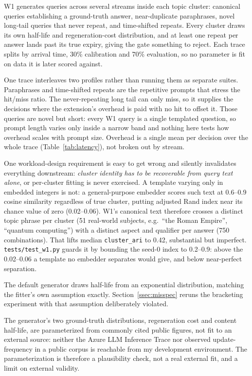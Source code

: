 \documentclass[10pt]{article}
\begin{document}
W1 generates queries across several streams inside each topic cluster: canonical queries
establishing a ground-truth answer, near-duplicate paraphrases, novel long-tail queries
that never repeat, and time-shifted repeats. Every cluster draws its own half-life and
regeneration-cost distribution, and at least one repeat per answer lands past its true
expiry, giving the gate something to reject. Each trace splits by arrival time, 30\%
calibration and 70\% evaluation, so no parameter is fit on data it is later scored
against.

One trace interleaves two profiles rather than running them as separate suites. Paraphrases
and time-shifted repeats are the repetitive prompts that stress the hit/miss ratio. The
never-repeating long tail can only miss, so it supplies the decisions where the extension's
overhead is paid with no hit to offset it. Those queries are novel but short: every W1 query is
a single templated question, so prompt length varies only inside a narrow band and nothing
here tests how overhead scales with prompt size. Overhead is a single mean per decision over
the whole trace (Table~\ref{tab:latency}), not broken out by stream.

One workload-design requirement is easy to get wrong and silently invalidates everything
downstream: \emph{cluster identity has to be recoverable from query text alone}, or
per-cluster fitting is never exercised. A template varying only in embedded integers is not:
a general-purpose embedder scores such text at 0.6--0.9 cosine similarity regardless of true
cluster, putting adjusted Rand index near its chance value of zero (0.02--0.06). W1's canonical
text therefore crosses a distinct topic phrase per cluster (51 real-world subjects, e.g.\
``the Roman Empire'', ``quantum computing'') with a distinct aspect and qualifier per answer
(750 combinations). That lifts median \texttt{cluster\_ari} to 0.42, substantial but imperfect.
\texttt{tests/test\_w1.py} guards it by bounding the seed-0 index to 0.2--0.9: above the
0.02--0.06 a template no embedder separates would give, and below near-perfect separation.

The default generator draws half-life from an exponential distribution, matching the fitter's
own assumption exactly. Section~\ref{ssec:misspec} reruns the bracketing experiment with that
assumption deliberately violated.

The generator's two ground-truth distributions, regeneration cost and content half-life, are
parameterized from commonly cited public figures, not fit to an external source: neither the
Azure LLM Inference Trace nor observed update-frequency in a public corpus is reachable from
my development environment. The parameterization is therefore a plausibility check, not a
real external fit, and a limit on external validity.
\end{document}
